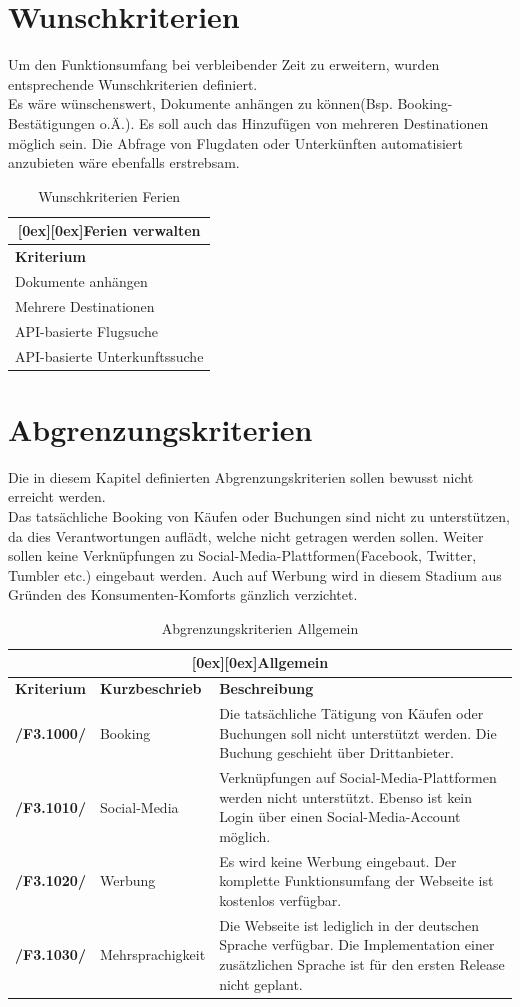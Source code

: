 \documentclass[10pt,a4paper,titlepage,twoside,german,final]{zhawreprt}
\newcommand{\AddRequirement}[2]{
\textbf{/#1#2/}
}
\newcommand{\D}[1]{
\AddRequirement{F3.}{#1}
}
\newcommand{\tableheader}[2]{\multicolumn{#1}{c}{\raisebox{-0.3em}[0ex][0ex]{\large{\textbf{#2}}}}}
\numberwithin{table}{chapter}
\begin{document}
\section{Wunschkriterien}\label{sec:WishCriteria}
Um den Funktionsumfang bei verbleibender Zeit zu erweitern, wurden entsprechende Wunschkriterien definiert.\\
Es wäre wünschenswert, Dokumente anhängen zu können(Bsp. Booking-Bestätigungen o.Ä.). Es soll auch das Hinzufügen von mehreren Destinationen möglich sein. Die Abfrage von Flugdaten oder Unterkünften automatisiert anzubieten wäre ebenfalls erstrebsam.
\begin{table}[ht]\centering
\begin{tabular}{l}\hline
\tableheader{1}{Ferien verwalten}\\[0.3em]\hline
\textbf{Kriterium}\\\hline
Dokumente anhängen\\\hline
Mehrere Destinationen\\\hline
API-basierte Flugsuche\\\hline
API-basierte Unterkunftssuche\\\hline
\end{tabular}
\caption{Wunschkriterien Ferien}\label{tbl:WishVacation}
\end{table}
\section{Abgrenzungskriterien}\label{sec:DistinctionCriteria}
Die in diesem Kapitel definierten Abgrenzungskriterien sollen bewusst nicht erreicht werden.\\
Das tatsächliche Booking von Käufen oder Buchungen sind nicht zu unterstützen, da dies Verantwortungen auflädt, welche nicht getragen werden sollen. Weiter sollen keine Verknüpfungen zu Social-Media-Plattformen(Facebook, Twitter, Tumbler etc.) eingebaut werden. Auch auf Werbung wird in diesem Stadium aus Gründen des Konsumenten-Komforts gänzlich verzichtet.
\begin{table}[ht]\centering
\begin{tabular}{l|p{2.5cm}|p{8cm}}\hline
\tableheader{3}{Allgemein}\\[0.3em]\hline
\textbf{Kriterium} & \textbf{Kurzbeschrieb} & \textbf{Beschreibung}\\\hline
\D{1000} & Booking & Die tatsächliche Tätigung von Käufen oder Buchungen soll nicht unterstützt werden. Die Buchung geschieht über Drittanbieter.\\\hline
\D{1010} & Social-Media & Verknüpfungen auf Social-Media-Plattformen werden nicht unterstützt. Ebenso ist kein Login über einen Social-Media-Account möglich.\\\hline
\D{1020} & Werbung & Es wird keine Werbung eingebaut. Der komplette Funktionsumfang der Webseite ist kostenlos verfügbar.\\\hline
\D{1030} & Mehrsprachigkeit & Die Webseite ist lediglich in der deutschen Sprache verfügbar. Die Implementation einer zusätzlichen Sprache ist für den ersten Release nicht geplant.\\\hline
\end{tabular}
\caption{Abgrenzungskriterien Allgemein}\label{tbl:DistinctionGeneral}
\end{table}
\end{document}
